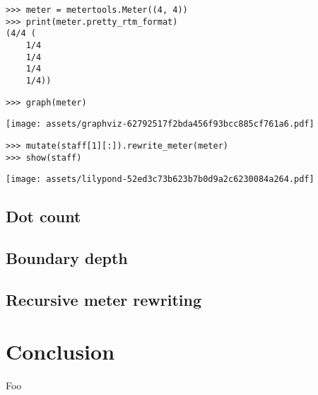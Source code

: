 \begin{singlespacing}
\vspace{-0.5\baselineskip}
\begin{lstlisting}
>>> meter = metertools.Meter((4, 4))
>>> print(meter.pretty_rtm_format)
(4/4 (
	1/4
	1/4
	1/4
	1/4))
\end{lstlisting}
\begin{lstlisting}
>>> graph(meter)
\end{lstlisting}
\texttt{[image: assets/graphviz-62792517f2bda456f93bcc885cf761a6.pdf]}
\end{singlespacing}

\begin{comment}
<abjad>
mutate(staff[1][:]).rewrite_meter(meter)
show(staff)
</abjad>
\end{comment}

\begin{singlespacing}
\vspace{-0.5\baselineskip}
\begin{lstlisting}
>>> mutate(staff[1][:]).rewrite_meter(meter)
>>> show(staff)
\end{lstlisting}
\texttt{[image: assets/lilypond-52ed3c73b623b7b0d9a2c6230084a264.pdf]}
\end{singlespacing}

\subsection{Dot count}

\subsection{Boundary depth}

\subsection{Recursive meter rewriting}

\section{Conclusion}

Foo